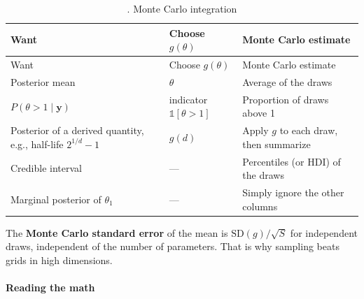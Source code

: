 \begin{longtable}[]{@{}
  >{\raggedright\arraybackslash}p{}
  >{\raggedright\arraybackslash}p{}
  >{\raggedright\arraybackslash}p{}@{}}
\caption{. Monte Carlo integration}\tabularnewline
\toprule\noalign{}
\begin{minipage}[b]{\linewidth}\raggedright
Want
\end{minipage} & \begin{minipage}[b]{\linewidth}\raggedright
Choose \(g(\theta)\)
\end{minipage} & \begin{minipage}[b]{\linewidth}\raggedright
Monte Carlo estimate
\end{minipage} \\
\midrule\noalign{}
\endfirsthead
\toprule\noalign{}
\begin{minipage}[b]{\linewidth}\raggedright
Want
\end{minipage} & \begin{minipage}[b]{\linewidth}\raggedright
Choose \(g(\theta)\)
\end{minipage} & \begin{minipage}[b]{\linewidth}\raggedright
Monte Carlo estimate
\end{minipage} \\
\midrule\noalign{}
\endhead
\bottomrule\noalign{}
\endlastfoot
Posterior mean & \(\theta\) & Average of the draws \\
\(P(\theta > 1 \mid \mathbf{y})\) & indicator \(\mathbb{1}[\theta > 1]\)
& Proportion of draws above 1 \\
Posterior of a derived quantity, e.g., half-life \(2^{1/d} - 1\) &
\(g(d)\) & Apply \(g\) to each draw, then summarize \\
Credible interval & --- & Percentiles (or HDI) of the draws \\
Marginal posterior of \(\theta_1\) & --- & Simply ignore the other
columns \\
\end{longtable}

The \textbf{Monte Carlo standard error} of the mean is
\(\mathrm{SD}(g)/\sqrt{S}\) for independent draws, independent of the
number of parameters. That is why sampling beats grids in high
dimensions.

\paragraph{Reading the math}

